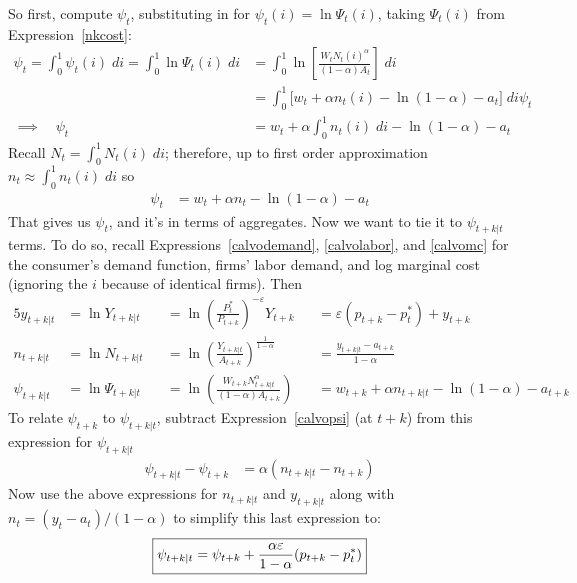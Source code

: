 \documentclass[12pt]{article}
\theoremstyle{plain}
\theoremstyle{definition}
\theoremstyle{remark}
\begin{document}
So first, compute $\psi_t$, substituting in for
$\psi_t(i)=\ln\Psi_t(i)$, taking $\Psi_t(i)$ from
Expression~\ref{nkcost}:
\begin{align*}
  \psi_t = \int_0^1 \psi_{t}(i) \; di
  = \int_0^1 \ln \Psi_t(i) \; di
  &= \int_0^1 \ln\left[\frac{W_t N_t(i)^\alpha}{(1-\alpha)A_t}\right] \; di
  \\
  &=\int_0^1 \big[w_t + \alpha n_t(i) - \ln(1-\alpha) - a_t\big] \; di
  \psi_t
  \\
  \implies\quad
  \psi_t &=w_t + \alpha \int_0^1 n_t(i)\; di - \ln(1-\alpha) - a_t
\end{align*}
Recall $N_t=\int_0^1 N_t(i)\;di$; therefore, up to first order
approximation $n_t\approx\int_0^1 n_t(i)\; di$ so
\begin{align}
  \psi_t &=w_t + \alpha n_t - \ln(1-\alpha) - a_t
  \label{calvopsi}
\end{align}
That gives us $\psi_t$, and it's in terms of aggregates. Now we want
to tie it to $\psi_{t+k|t}$ terms.
To do so, recall Expressions~\ref{calvodemand}, \ref{calvolabor},
and \ref{calvomc} for the consumer's demand function, firms' labor
demand, and log marginal cost (ignoring the $i$ because of identical
firms). Then
\begin{alignat*}{5}
  y_{t+k|t}
  &= \ln Y_{t+k|t}
  &&=
  \ln \left(
  \frac{P_t^*}{P_{t+k}}
  \right)^{-\varepsilon}
  Y_{t+k}
  &&=
  \varepsilon(p_{t+k}-p_t^*) + y_{t+k}
  \\
  n_{t+k|t}
  &= \ln N_{t+k|t}
  &&= \ln \left(\frac{Y_{t+k|t}}{A_{t+k}}\right)^{\frac{1}{1-\alpha}}
  &&= \frac{y_{t+k|t}-a_{t+k}}{1-\alpha}
  \\
  \psi_{t+k|t}
  &= \ln \Psi_{t+k|t}
  &&= \ln\left(
  \frac{W_{t+k} N_{t+k|t}^\alpha}{(1-\alpha)A_{t+k}}
  \right)
  &&= w_{t+k} + \alpha n_{t+k|t} - \ln(1-\alpha) - a_{t+k}
\end{alignat*}
To relate $\psi_{t+k}$ to $\psi_{t+k|t}$, subtract
Expression~\ref{calvopsi} (at $t+k$) from
this expression for $\psi_{t+k|t}$
\begin{align*}
  \psi_{t+k|t} - \psi_{t+k}
  &=
  \alpha (n_{t+k|t} - n_{t+k})
\end{align*}
Now use the above expressions for $n_{t+k|t}$ and $y_{t+k|t}$ along
with $n_t = (y_t-a_t)/(1-\alpha)$ to simplify this last expression
to:
\begin{align}
  \boxed{%
  \psi_{t+k|t}
  =
  \psi_{t+k} +
  \frac{\alpha\varepsilon }{1-\alpha}
  (p_{t+k}-p_t^*)
  }
  \label{calvomcrelate2}
\end{align}
\end{document}
